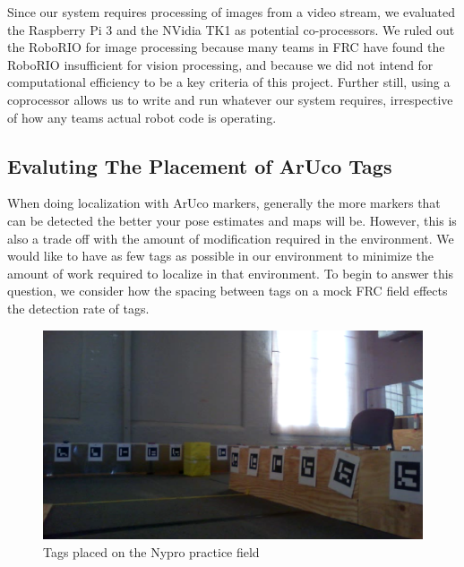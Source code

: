 \documentclass{article}
\begin{document}
    Since our system requires processing of images from a video stream, we evaluated the Raspberry Pi 3 and the NVidia TK1 as potential co-processors. We ruled out the RoboRIO for image processing because many teams in FRC have found the RoboRIO insufficient for vision processing, and because we did not intend for computational efficiency to be a key criteria of this project. Further still, using a coprocessor allows us to write and run whatever our system requires, irrespective of how any teams actual robot code is operating.


  \subsection{Evaluting The Placement of ArUco Tags} \label{section:tag_placement}

    When doing localization with ArUco markers, generally the more markers that can be detected the better your pose estimates and maps will be. However, this is also a trade off with the amount of modification required in the environment. We would like to have as few tags as possible in our environment to minimize the amount of work required to localize in that environment. To begin to answer this question, we consider how the spacing between tags on a mock FRC field effects the detection rate of tags.

    \begin{figure}[H]
      \centering
      \includegraphics[width=1\linewidth]{./images/nypro_tag_spacing.png}
      \caption{Tags placed on the Nypro practice field}
      \label{fig:nypro_tag_spacing}
    \end{figure}
\end{document}
